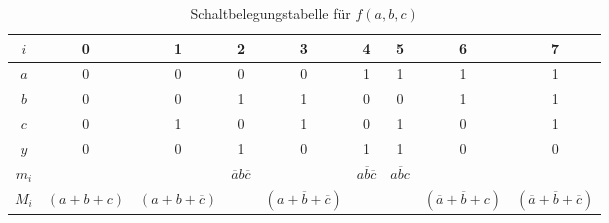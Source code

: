 \documentclass[11pt,a4paper]{scrreprt}
\begin{document}
\begin{table}
\caption{Schaltbelegungstabelle für $f(a, b, c)$}
\label{SBT_bsp}
\resizebox{1\textwidth}{!} {
\begin{tabular}{c*{8}{c}}
$i$              &        0      &             1            &              2              &                  3                  &                 4           &        5         &                 6                   &                       7                        \\ \hline
$a$              &        0      &             0            &              0              &                  0                  &                 1           &        1         &                 1                   &                       1                        \\ 
$b$              &        0      &             0            &              1              &                  1                  &                 0           &        0         &                 1                   &                       1                        \\
$c$              &        0      &             1            &              0              &                  1                  &                 0           &        1         &                 0                   &                       1                        \\ \hline
$y$              &        0      &             0            &              1              &                  0                  &                 1           &        1         &                 0                   &                       0                        \\
\hline\noalign{\smallskip}                                                                                                                                                                                                                                                              
$m_i$            &               &                          & $\overline{a}b\overline{c}$ &                                     & $a\overline{b}\overline{c}$ & $a\overline{b}c$ &                                     &                                                \\
\hline\noalign{\smallskip}
$M_i$            & $(a + b + c)$ & $(a + b + \overline{c})$ &                             & $(a + \overline{b} + \overline{c})$ &                             &                  & $(\overline{a} + \overline{b} + c)$ & $(\overline{a} + \overline{b} + \overline{c})$ \\
\end{tabular}
}
\end{table}
\end{document}

